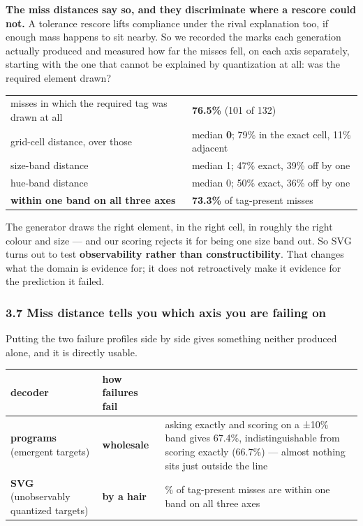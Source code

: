 \documentclass[
  10pt,
]{article}
\theoremstyle{plain}
\theoremstyle{definition}
\begin{document}
\textbf{The miss distances say so, and they discriminate where a rescore
could not.} A tolerance rescore lifts compliance under the rival
explanation too, if enough mass happens to sit nearby. So we recorded
the marks each generation actually produced and measured how far the
misses fell, on each axis separately, starting with the one that cannot
be explained by quantization at all: was the required element drawn?

{\footnotesize
\begin{longtable}[]{@{}>{\raggedright\arraybackslash}p{}>{\raggedright\arraybackslash}p{}@{}}
\toprule\noalign{}
& \\
\midrule\noalign{}
\endhead
\bottomrule\noalign{}
\endlastfoot
misses in which the required tag was drawn at all & \textbf{76.5\%} (101
of 132) \\
grid-cell distance, over those & median \textbf{0}; 79\% in the exact
cell, 11\% adjacent \\
size-band distance & median 1; 47\% exact, 39\% off by one \\
hue-band distance & median 0; 50\% exact, 36\% off by one \\
\textbf{within one band on all three axes} & \textbf{73.3\%} of
tag-present misses \\
\end{longtable}}

The generator draws the right element, in the right cell, in roughly the
right colour and size --- and our scoring rejects it for being one size
band out. So SVG turns out to test \textbf{observability rather than
constructibility}. That changes what the domain is evidence for; it does
not retroactively make it evidence for the prediction it failed.

\subsubsection{3.7 Miss distance tells you which axis you are failing
on}\label{37-miss-distance-tells-you-which-axis-you-are-failing-on}

Putting the two failure profiles side by side gives something neither
produced alone, and it is directly usable.

{\footnotesize
\begin{longtable}[]{@{}>{\raggedright\arraybackslash}p{}>{\raggedright\arraybackslash}p{}>{\raggedright\arraybackslash}p{}@{}}
\toprule\noalign{}
decoder & how failures fail & \\
\midrule\noalign{}
\endhead
\bottomrule\noalign{}
\endlastfoot
\textbf{programs} (emergent targets) & \textbf{wholesale} & asking
exactly and scoring on a ±10\% band gives 67.4\%, indistinguishable from
scoring exactly (66.7\%) --- almost nothing sits just outside the
line \\
\textbf{SVG} (unobservably quantized targets) & \textbf{by a hair} &
73.3\% of tag-present misses are within one band on all three axes \\
\end{longtable}}
\end{document}
